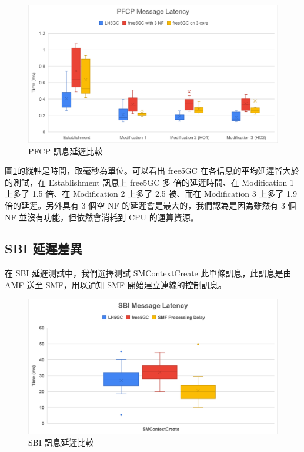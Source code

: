 \begin{figure}[htb]
    \centering
    \includegraphics[height=!,width=0.9\linewidth,keepaspectratio=true]{figures/cp_pfcp_comp}
    \caption[PFCP 訊息延遲比較]{{\footnotesize PFCP 訊息延遲比較}}
    \label{fig:cp_pfcp_comp}
\end{figure}

圖\ref{fig:cp_pfcp_comp}的縱軸是時間，取毫秒為單位。可以看出 free5GC 在各信息的平均延遲皆大於 \LHCN 的測試，在 Establishment 訊息上 free5GC 多  倍的延遲時間、在 Modification 1 上多了 1.5 倍、在 Modification 2 上多了 2.5 被、而在 Modification 3 上多了 1.9 倍的延遲。另外具有 3 個空 NF 的延遲會是最大的，我們認為是因為雖然有 3 個 NF 並沒有功能，但依然會消耗到 CPU 的運算資源。

\subsection{SBI 延遲差異}
\label{subsec:sbi_comp}

在 SBI 延遲測試中，我們選擇測試 SMContextCreate 此單條訊息，此訊息是由 AMF 送至 SMF，用以通知 SMF 開始建立連線的控制訊息。

\begin{figure}[htbp]
    \centering
    \includegraphics[height=!,width=0.8\linewidth,keepaspectratio=true]{figures/cp_sbi_comp}
    \caption[SBI 訊息延遲比較]{{\footnotesize SBI 訊息延遲比較}}
    \label{fig:cp_sbi_comp}
\end{figure}

